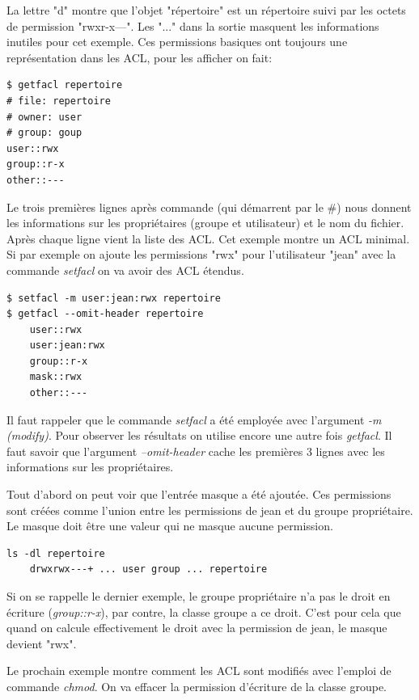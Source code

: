 La lettre "d" montre que l'objet "répertoire" est un répertoire suivi par les octets de permission "rwxr-x---". Les "..." dans la sortie masquent les informations inutiles pour cet exemple. Ces permissions basiques ont toujours une représentation dans les ACL, pour les afficher on fait:

\begin{verbatim}
$ getfacl repertoire
# file: repertoire 
# owner: user 
# group: goup
user::rwx
group::r-x
other::---
\end{verbatim}

Le trois premières lignes après commande (qui démarrent par le \#) nous donnent les informations sur les propriétaires (groupe et utilisateur) et le nom du fichier. Après chaque ligne vient la liste des ACL. Cet exemple montre un ACL minimal. Si par exemple on ajoute les permissions "rwx" pour l'utilisateur "jean" avec la commande \emph{setfacl} on va avoir des ACL étendus.

\begin{verbatim}
$ setfacl -m user:jean:rwx repertoire
$ getfacl --omit-header repertoire 
	user::rwx 
	user:jean:rwx	
	group::r-x 
	mask::rwx 
	other::---
\end{verbatim}

Il faut rappeler que le commande \emph{setfacl} a été employée avec l'argument \emph{-m (modify)}. Pour observer les résultats on utilise encore une autre fois \emph{getfacl}. Il faut savoir que l'argument \emph{--omit-header} cache les premières 3 lignes avec les informations sur les propriétaires.  

Tout d'abord on peut voir que l'entrée masque a été ajoutée. Ces permissions sont créées comme l'union entre les permissions de jean et du groupe propriétaire. Le masque doit être une valeur qui ne masque aucune permission.  

\begin{verbatim}
ls -dl repertoire
	drwxrwx---+ ... user group ... repertoire
\end{verbatim}

Si on se rappelle le dernier exemple, le groupe propriétaire n'a pas le droit en écriture (\emph{group::r-x}), par contre, la classe groupe a ce droit. C'est pour cela que quand on calcule effectivement le droit avec la permission de jean, le masque devient "rwx".

Le prochain exemple montre comment les ACL sont modifiés avec l'emploi de commande \emph{chmod}. On va effacer la permission d'écriture de la classe groupe.

